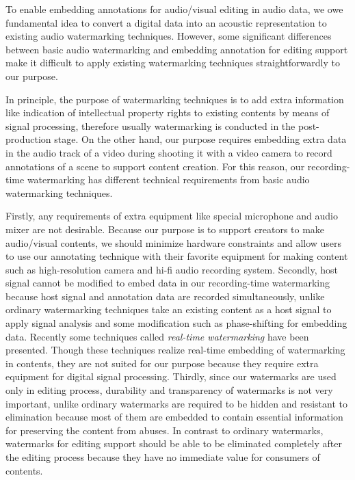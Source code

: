 To enable embedding annotations for audio/visual editing in audio data, we owe fundamental idea to convert a digital data into an acoustic representation to existing audio watermarking techniques.
However, some significant differences between basic audio watermarking and embedding annotation for editing support make it difficult to apply existing watermarking techniques straightforwardly to our purpose.

In principle, the purpose of watermarking techniques is to add extra information like indication of intellectual property rights to existing contents by means of signal processing, therefore usually watermarking is conducted in the post-production stage.
On the other hand, our purpose requires embedding extra data in the audio track of a video during shooting it with a video camera to record annotations of a scene to support content creation.
For this reason, our recording-time watermarking has different technical requirements from basic audio watermarking techniques.

Firstly, any requirements of extra equipment like special microphone and audio mixer are not desirable.
Because our purpose is to support creators to make audio/visual contents, we should minimize hardware constraints and allow users to use our annotating technique with their favorite equipment for making content such as high-resolution camera and hi-fi audio recording system.
Secondly, host signal cannot be modified to embed data in our recording-time watermarking because host signal and annotation data are recorded simultaneously, unlike ordinary watermarking techniques take an existing content as a host signal to apply signal analysis and some modification such as phase-shifting for embedding data. %
Recently some techniques called {\it real-time watermarking} have been presented. Though these techniques realize real-time embedding of watermarking in contents, they are not suited for our purpose because they require extra equipment for digital signal processing.
Thirdly, since our watermarks are used only in editing process, durability and transparency of watermarks is not very important, unlike ordinary watermarks are required to be hidden and resistant to elimination because most of them are embedded to contain essential information for preserving the content from abuses.
In contrast to ordinary watermarks, watermarks for editing support should be able to be eliminated completely after the editing process because they have no immediate value for consumers of contents.

